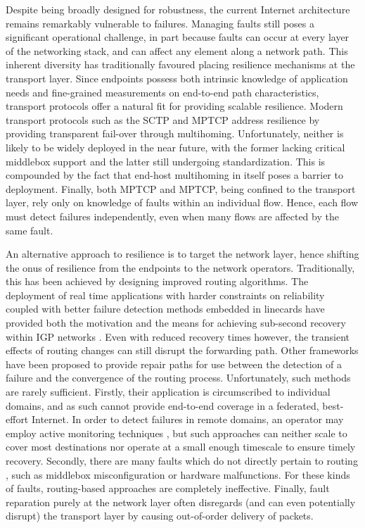 
Despite being broadly designed for robustness, the current Internet architecture remains remarkably vulnerable to failures.
Managing faults still poses a significant operational challenge, in part because faults can occur at every layer of the networking stack, and can affect any element along a network path. 
This inherent diversity has traditionally favoured placing resilience mechanisms at the transport layer. 
Since endpoints possess both intrinsic knowledge of application needs and fine-grained measurements on end-to-end path characteristics, transport protocols offer a natural fit for providing scalable resilience.
Modern transport protocols such as the \ac{SCTP} \cite{rfc4960} and \ac{MPTCP} \cite{Wischik:2008p137} address resilience by providing transparent fail-over through multihoming.
Unfortunately, neither is likely to be widely deployed in the near future, with the former lacking critical middlebox support and the latter still undergoing standardization. 
This is compounded by the fact that end-host multihoming in itself poses a barrier to deployment.
Finally, both \ac{MPTCP} and \ac{MPTCP}, being confined to the transport layer, rely only on knowledge of faults within an individual flow. Hence, each flow must detect failures independently, even when many flows are affected by the same fault.

An alternative approach to resilience is to target the network layer, hence shifting the onus of resilience from the endpoints to the network operators.
Traditionally, this has been achieved by designing improved routing algorithms.
The deployment of real time applications with harder constraints on reliability coupled with better failure detection methods embedded in linecards have provided both the motivation and the means for achieving sub-second recovery within \ac{IGP} networks \cite{Francois:2005p514}.
Even with reduced recovery times however, the transient effects of routing changes can still disrupt the forwarding path. 
Other frameworks \cite{Bryant:2007p522,Torvi:2008p518,Lor:2010:PRE:1868447.1868449} have been proposed to provide repair paths for use between the detection of a failure and the convergence of the routing process.
Unfortunately, such methods are rarely sufficient.
Firstly, their application is circumscribed to individual domains, and as such cannot provide end-to-end coverage in a federated, best-effort Internet. 
In order to detect failures in remote domains, an operator may employ active monitoring techniques \cite{DBLP:conf/im/FokLMLLCC13}, but such approaches can neither scale to cover most destinations nor operate at a small enough timescale to ensure timely recovery.
Secondly, there are many faults which do not directly pertain to routing \cite{Turner:2010:CFL:2043164.1851220}, such as middlebox misconfiguration or hardware malfunctions.
For these kinds of faults, routing-based approaches are completely ineffective.
Finally, fault reparation purely at the network layer often disregards (and can even potentially disrupt) the transport layer by causing out-of-order delivery of packets.

